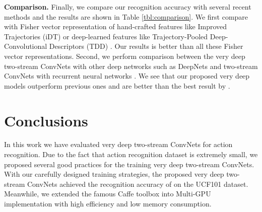 \documentclass[10pt,twocolumn,letterpaper]{article}
\begin{document}
{\bf Comparison.} Finally, we compare our recognition accuracy with several recent methods and the results are shown in Table \ref{tbl:comparison}. We first compare with Fisher vector representation of hand-crafted features like Improved Trajectories (iDT) \cite{WangS13a} or deep-learned features like Trajectory-Pooled Deep-Convolutional Descriptors (TDD) \cite{WangQT15a}. Our results is better than all these Fisher vector representations. Second, we perform comparison between the very deep two-stream ConvNets with other deep networks such as DeepNets \cite{KarpathyTSLSF14} and two-stream ConvNets with recurrent neural networks \cite{Ng15}. We see that our proposed very deep models outperform previous ones and are better than the best result by .

\section{Conclusions}
\label{sec:conclusion}

In this work we have evaluated very deep two-stream ConvNets for action recognition. Due to the fact that action recognition dataset is extremely small, we proposed several good practices for the training very deep two-stream ConvNets. With our carefully designed training strategies, the proposed very deep two-stream ConvNets achieved the recognition accuracy of  on the UCF101 dataset. Meanwhile, we extended the famous Caffe toolbox into Multi-GPU implementation with high efficiency and low memory consumption.

{


}
\end{document}

